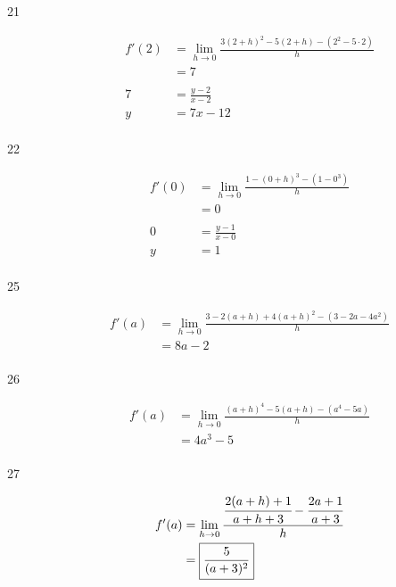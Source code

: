 \documentclass[letterpaper, landscape]{exam}
\begin{document}
\begin{description}
      \item[21] 
        \begin{align*}
          f'(2) & = \lim_{h \to 0} \frac{3 (2 + h)^2 - 5(2 + h) - \left( 2^2 - 5 \cdot 2 \right)}{h} \\
                & = 7 \\
          \\
          7     & = \frac{y - 2}{x - 2} \\
          y     & = 7x - 12 \\
        \end{align*}
 
      \item[22] 
        \begin{align*}
          f'(0) & = \lim_{h \to 0} \frac{1 - (0 + h)^3 - \left( 1 - 0^3 \right)}{h} \\
                & = 0 \\
          \\
          0     & = \frac{y - 1}{x - 0} \\
          y     & = 1 \\
        \end{align*}
 
      \item[25]
        \begin{align*}
          f'(a) & =\lim_{h \to 0} \frac{3 - 2(a + h) + 4 \left( a + h \right)^2 - \left( 3 - 2a - 4a^2 \right)}{h} \\
                & = \boxed{ 8a - 2 } \\
        \end{align*}

      \item[26]
        \begin{align*}
          f'(a) & = \lim_{h \to 0} \frac{ (a + h)^4 - 5(a + h) - \left( a^4 - 5a \right)}{h} \\
                & = \boxed{ 4a^3 - 5 } \\
        \end{align*}
 
      \item[27]
        \begin{align*}
          f'(a) & = \lim_{h \to 0} \frac{ \cfrac{2(a + h) + 1}{a + h + 3} - \cfrac{2a + 1}{a + 3}}{h} \\
                & = \boxed{ \frac{5}{(a + 3)^2} } \\
        \end{align*}
 

\end{description}
\end{document}
